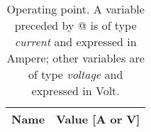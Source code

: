 \begin{table}[h]
  \centering
  \begin{tabular}{|l|r|}
    \hline    
    {\bf Name} & {\bf Value [A or V]} \\ \hline
    
 \end{tabular}
 \caption{Operating point. A variable preceded by @ is of type {\em current}
   and expressed in Ampere; other variables are of type {\it voltage} and expressed in
   Volt.}
  \label{tab:op}
\end{table}

